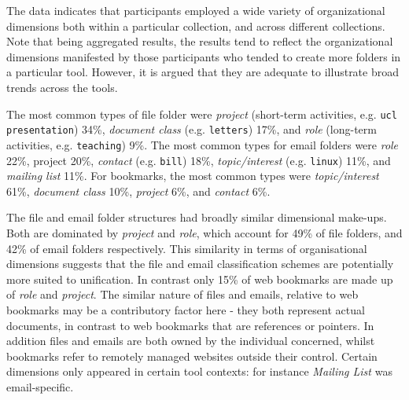 The data indicates that participants employed a wide variety of organizational dimensions both within a particular collection, and across different collections.  Note that being aggregated results, the results tend to reflect the organizational dimensions manifested by those participants who tended to create more folders in a particular tool.  However, it is argued that they are adequate to illustrate broad trends across the tools.

The most common types of file folder were \textit{project} (short-term activities, e.g. \texttt{ucl presentation}) 34\%, \textit{document class} (e.g. \texttt{letters}) 17\%, and \textit{role} (long-term activities, e.g. \texttt{teaching}) 9\%. The most common types for email folders were \textit{role} 22\%, project 20\%, \textit{contact} (e.g. \texttt{bill}) 18\%, \textit{topic/interest} (e.g. \texttt{linux}) 11\%, and \textit{mailing list} 11\%. For bookmarks, the most common types were \textit{topic/interest} 61\%, \textit{document class} 10\%, \textit{project} 6\%, and \textit{contact} 6\%. 


The file and email folder structures had broadly similar dimensional make-ups. Both are dominated by \textit{project} and \textit{role}, which account for 49\% of file folders, and 42\% of email folders respectively. This similarity in terms of organisational dimensions suggests that the file and email classification schemes are potentially more suited to unification. In contrast only 15\% of web bookmarks are made up of \textit{role} and \textit{project}. The similar nature of files and emails, relative to web bookmarks may be a contributory factor here - they both represent actual documents, in contrast to web bookmarks that are references or pointers. In addition files and emails are both owned by the individual concerned, whilst bookmarks refer to remotely managed websites outside their control. Certain dimensions only appeared in certain tool contexts: for instance \textit{Mailing List} was email-specific. %


